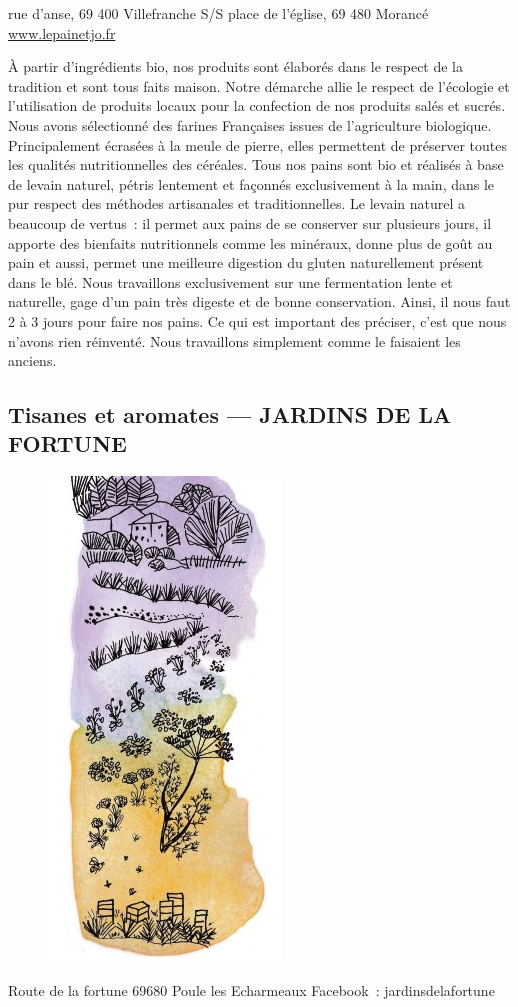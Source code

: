 \documentclass[8pt,a4paper,french]{article}
\makeatletter
\newcommand{\authoredby}[1]{\addtocontents{toc}{\protect\@nameuse{authoredby#1}}}%
\makeatother
\begin{document}
 rue d’anse, 69 400 Villefranche S/S place de l’église, 69 480 Morancé \newline
\href{https://www.lepainetjo.fr}{www.lepainetjo.fr}\newline

\noindent À partir d’ingrédients bio, nos produits sont élaborés dans
le respect de la tradition et sont tous faits maison. Notre démarche
allie le respect de l’écologie et l’utilisation de produits locaux
pour la confection de nos produits salés et sucrés. Nous avons
sélectionné des farines Françaises issues de l’agriculture
biologique. Principalement écrasées à la meule de pierre, elles
permettent de préserver toutes les qualités nutritionnelles des
céréales.  Tous nos pains sont bio et réalisés à base de levain
naturel, pétris lentement et façonnés exclusivement à la main, dans le
pur respect des méthodes artisanales et traditionnelles. Le levain
naturel a beaucoup de vertus\ : il permet aux pains de se conserver sur
plusieurs jours, il apporte des bienfaits nutritionnels comme les
minéraux, donne plus de goût au pain et aussi, permet une meilleure
digestion du gluten naturellement présent dans le blé. Nous
travaillons exclusivement sur une fermentation lente et naturelle,
gage d’un pain très digeste et de bonne conservation. Ainsi, il nous
faut 2 à 3 jours pour faire nos pains. Ce qui est important des
préciser, c’est que nous n’avons rien réinventé. Nous travaillons
simplement comme le faisaient les anciens.

\authoredby{B}
\subsection{Tisanes et aromates --- JARDINS DE LA FORTUNE}\label{subsec:tisanes}

\begin{figure}
\includegraphics[height=0.25\textwidth]{Tisanes1.png}
\end{figure}

 Route de la fortune 69680 Poule les  Echarmeaux\newline
Facebook\ : jardinsdelafortune\newline
\end{document}

